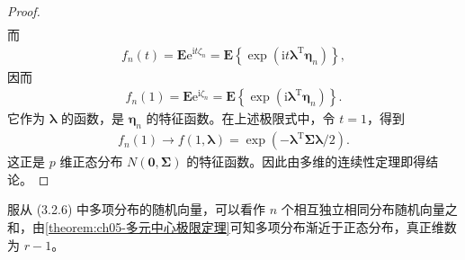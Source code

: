 \documentclass[../../main.tex]{subfiles}
\begin{document}
\begin{proof}
\begin{align}
\end{align}
而
\begin{align*}
f_n(t)=\boldsymbol{E}\mathrm{e}^{\mathrm{i}t\zeta_n}=\boldsymbol{E}\!\left\{\exp\!\left(\mathrm{i}t\boldsymbol{\lambda}^{\mathrm{T}}\boldsymbol{\eta}_n\right)\right\},
\end{align*}
因而
\begin{align*}
f_n(1)=\boldsymbol{E}\mathrm{e}^{\mathrm{i}\zeta_n}=\boldsymbol{E}\!\left\{\exp\!\left(\mathrm{i}\boldsymbol{\lambda}^{\mathrm{T}}\boldsymbol{\eta}_n\right)\right\}.
\end{align*}
它作为 $\boldsymbol{\lambda}$ 的函数，是 $\boldsymbol{\eta}_n$ 的特征函数。在上述极限式中，令 $t=1$，得到
\begin{align}
f_n(1)\to f(1,\boldsymbol{\lambda})=\exp\!\left(-\boldsymbol{\lambda}^{\mathrm{T}}\boldsymbol{\Sigma}\boldsymbol{\lambda}/2\right).
\end{align}
这正是 $p$ 维正态分布 $N(\boldsymbol{0},\boldsymbol{\Sigma})$ 的特征函数。因此由多维的连续性定理即得结论。
\end{proof}

\begin{example}\label{example:ch05-多项分布渐近正态}
服从 (3.2.6) 中多项分布的随机向量，可以看作 $n$ 个相互独立相同分布随机向量之和，由\cref{theorem:ch05-多元中心极限定理}可知多项分布渐近于正态分布，真正维数为 $r-1$。
\end{example}
\end{document}
